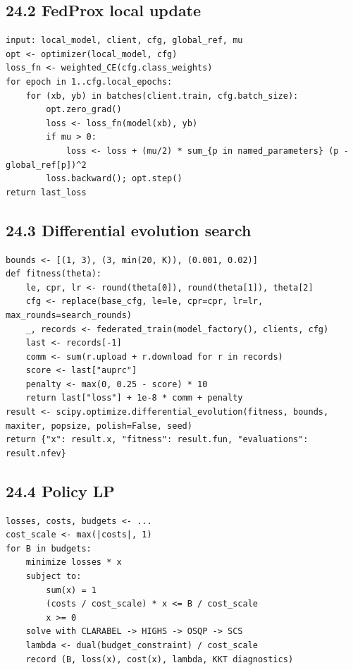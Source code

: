 \documentclass{article}
\begin{document}
\subsection{24.2 FedProx local update}


\begin{lstlisting}[basicstyle=\scriptsize\ttfamily,breaklines=true]
input: local_model, client, cfg, global_ref, mu
opt <- optimizer(local_model, cfg)
loss_fn <- weighted_CE(cfg.class_weights)
for epoch in 1..cfg.local_epochs:
    for (xb, yb) in batches(client.train, cfg.batch_size):
        opt.zero_grad()
        loss <- loss_fn(model(xb), yb)
        if mu > 0:
            loss <- loss + (mu/2) * sum_{p in named_parameters} (p - global_ref[p])^2
        loss.backward(); opt.step()
return last_loss
\end{lstlisting}


\subsection{24.3 Differential evolution search}


\begin{lstlisting}[basicstyle=\scriptsize\ttfamily,breaklines=true]
bounds <- [(1, 3), (3, min(20, K)), (0.001, 0.02)]
def fitness(theta):
    le, cpr, lr <- round(theta[0]), round(theta[1]), theta[2]
    cfg <- replace(base_cfg, le=le, cpr=cpr, lr=lr, max_rounds=search_rounds)
    _, records <- federated_train(model_factory(), clients, cfg)
    last <- records[-1]
    comm <- sum(r.upload + r.download for r in records)
    score <- last["auprc"]
    penalty <- max(0, 0.25 - score) * 10
    return last["loss"] + 1e-8 * comm + penalty
result <- scipy.optimize.differential_evolution(fitness, bounds, maxiter, popsize, polish=False, seed)
return {"x": result.x, "fitness": result.fun, "evaluations": result.nfev}
\end{lstlisting}


\subsection{24.4 Policy LP}


\begin{lstlisting}[basicstyle=\scriptsize\ttfamily,breaklines=true]
losses, costs, budgets <- ...
cost_scale <- max(|costs|, 1)
for B in budgets:
    minimize losses * x
    subject to:
        sum(x) = 1
        (costs / cost_scale) * x <= B / cost_scale
        x >= 0
    solve with CLARABEL -> HIGHS -> OSQP -> SCS
    lambda <- dual(budget_constraint) / cost_scale
    record (B, loss(x), cost(x), lambda, KKT diagnostics)
\end{lstlisting}
\end{document}
